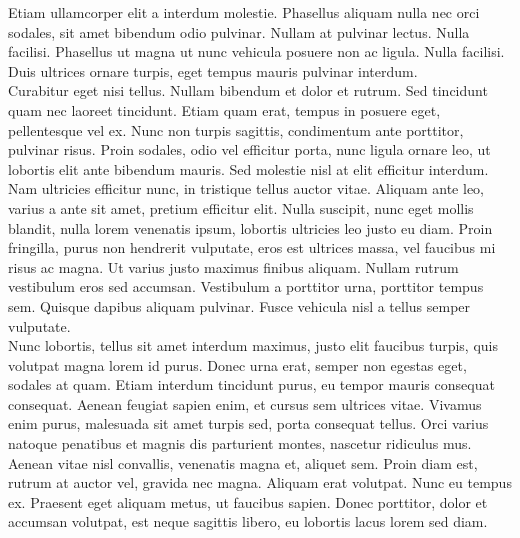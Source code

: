 \documentclass[9pt,twocolumn,twoside,lineno]{pnas-new}
\begin{document}
Etiam ullamcorper elit a interdum molestie. Phasellus aliquam nulla nec orci sodales, sit amet bibendum odio pulvinar. Nullam at pulvinar lectus. Nulla facilisi. Phasellus ut magna ut nunc vehicula posuere non ac ligula. Nulla facilisi. Duis ultrices ornare turpis, eget tempus mauris pulvinar interdum.\\

Curabitur eget nisi tellus. Nullam bibendum et dolor et rutrum. Sed tincidunt quam nec laoreet tincidunt. Etiam quam erat, tempus in posuere eget, pellentesque vel ex. Nunc non turpis sagittis, condimentum ante porttitor, pulvinar risus. Proin sodales, odio vel efficitur porta, nunc ligula ornare leo, ut lobortis elit ante bibendum mauris. Sed molestie nisl at elit efficitur interdum.\\

Nam ultricies efficitur nunc, in tristique tellus auctor vitae. Aliquam ante leo, varius a ante sit amet, pretium efficitur elit. Nulla suscipit, nunc eget mollis blandit, nulla lorem venenatis ipsum, lobortis ultricies leo justo eu diam. Proin fringilla, purus non hendrerit vulputate, eros est ultrices massa, vel faucibus mi risus ac magna. Ut varius justo maximus finibus aliquam. Nullam rutrum vestibulum eros sed accumsan. Vestibulum a porttitor urna, porttitor tempus sem. Quisque dapibus aliquam pulvinar. Fusce vehicula nisl a tellus semper vulputate.\\

Nunc lobortis, tellus sit amet interdum maximus, justo elit faucibus turpis, quis volutpat magna lorem id purus. Donec urna erat, semper non egestas eget, sodales at quam. Etiam interdum tincidunt purus, eu tempor mauris consequat consequat. Aenean feugiat sapien enim, et cursus sem ultrices vitae. Vivamus enim purus, malesuada sit amet turpis sed, porta consequat tellus. Orci varius natoque penatibus et magnis dis parturient montes, nascetur ridiculus mus. Aenean vitae nisl convallis, venenatis magna et, aliquet sem. Proin diam est, rutrum at auctor vel, gravida nec magna. Aliquam erat volutpat. Nunc eu tempus ex. Praesent eget aliquam metus, ut faucibus sapien. Donec porttitor, dolor et accumsan volutpat, est neque sagittis libero, eu lobortis lacus lorem sed diam.\\


\pnasbreak


\end{document}
